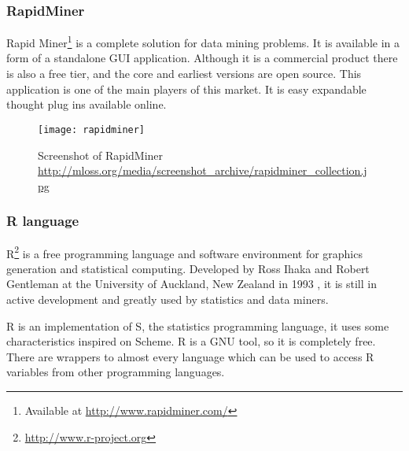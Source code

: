 \subsubsection{RapidMiner}

Rapid Miner\footnote{ Available at \url{http://www.rapidminer.com/}} is a complete solution for data mining problems. It is available in a form of
a standalone GUI application. Although it is a commercial product there is also a free tier, and the core and earliest versions are open source. This application
is one of the main players of this market. It is easy expandable thought plug ins available online.

\begin{figure}[h]
  \begin{center}
    \leavevmode
    \texttt{[image: rapidminer]}
    \caption{Screenshot of RapidMiner \url{http://mloss.org/media/screenshot_archive/rapidminer_collection.jpg}}
    \label{fig:RapidMiner}
  \end{center}
\end{figure}



\subsubsection{R language}
R\footnote{ \url{http://www.r-project.org}} is a free programming language and software environment for graphics generation and statistical computing.
Developed by Ross Ihaka and Robert Gentleman at the University of Auckland, New Zealand in 1993 \cite{Ihaka98r:past}, it is still in active development and
greatly used by statistics and data miners.

R is an implementation of S, the statistics programming language, it uses some characteristics inspired on Scheme.
R is a GNU tool, so it is completely free. There are wrappers to almost every language which can be used to access R variables from other programming languages.


